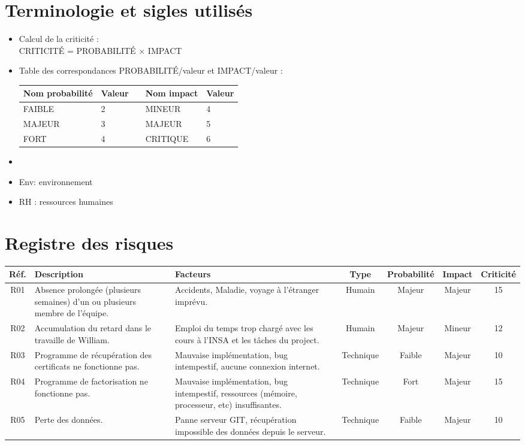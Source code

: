 \documentclass[a4paper,11pt,french]{article}
\begin{document}
\section{Terminologie et sigles utilisés}
\begin{itemize}
\item Calcul de la criticité :\\
{\centering CRITICITÉ = PROBABILITÉ $\times$ IMPACT}
\item Table des correspondances PROBABILITÉ/valeur et IMPACT/valeur :

\begin{center}
\begin{tabular}{|l|l|c|l|l|}
\hline
\textbf{Nom probabilité}&\textbf{Valeur}&&\textbf{Nom impact}&\textbf{Valeur}\\
\hline
FAIBLE&2&&MINEUR&4\\
\hline
MAJEUR&3&&MAJEUR&5\\
\hline
FORT&4&&CRITIQUE&6\\
\hline
\end{tabular}
\end{center}
\item []
\item Env: environnement
\item RH : ressources humaines
\end{itemize}
\section{Registre des risques}

\begin{center}
\begin{tabular}{|c|p{5cm}|p{3cm}|c|c|c|c|}
\hline
\textbf{Réf.} & \textbf{Description} & \textbf{Facteurs} & \textbf{Type} & \textbf{Probabilité} & \textbf{Impact} & \textbf{Criticité} \\
\hline
 R01 & Absence prolongée (plusieurs semaines) d'un ou plusieurs membre de l'équipe. &
 Accidents, Maladie, voyage à l'étranger imprévu. &
 Humain &
 Majeur &
 Majeur &
 15 \\
 \hline
 R02 & Accumulation du retard dans le travaille de William. &
 Emploi du temps trop chargé avec les cours à l'INSA et les tâches du project. &
 Humain &
 Majeur &
 Mineur &
 12 \\
 \hline
 R03 & Programme de récupération des certificats ne fonctionne pas. &
 Mauvaise implémentation, bug intempestif, aucune connexion internet.  &
 Technique &
 Faible &
 Majeur &
 10 \\
\hline
 R04 & Programme de factorisation ne fonctionne pas. &
 Mauvaise implémentation, bug intempestif, ressources (mémoire, processeur, etc) insuffisantes.  &
 Technique &
 Fort &
 Majeur &
 15 \\
\hline
 R05 & Perte des données. &
 Panne serveur GIT, récupération impossible des données depuis le serveur. &
 Technique &
 Faible &
 Majeur &
 10 \\
\hline

\end{tabular}
\end{center}
\end{document}
